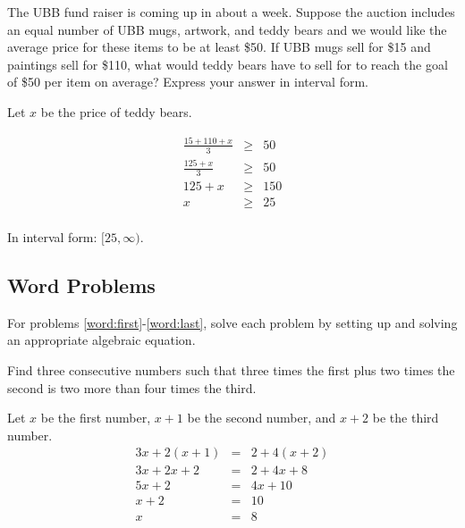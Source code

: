 \documentclass[fleqn,addpoints]{exam}
\begin{document}
\begin{questions}
\begin{solution}[4 cm]
\end{solution}

\question[5] 
\label{inequality:last}

The UBB fund raiser is coming up in about a week.  Suppose the auction includes an equal number of UBB
mugs, artwork, and teddy bears and we would like the average price for these items to be at least \$50.  If UBB mugs
sell for \$15 and paintings sell for \$110, what would teddy bears have to sell for to reach the goal of \$50 per item
on average?  Express your answer in interval form.

\begin{solution}[4 cm]
Let $x$ be the price of teddy bears.

\begin{eqnarray*}
  \frac{15 + 110 + x}{3} &\geq& 50 \\
  \frac{125 + x}{3} &\geq& 50 \\
  125 + x &\geq& 150 \\
  x &\geq& 25 \\
\end{eqnarray*}

In interval form: \( [25, \infty) \).
\end{solution}

\pagebreak

\subsection{Word Problems}

For problems \ref{word:first}-\ref{word:last}, solve each problem by setting up and solving an appropriate algebraic equation.

\question[5]
\label{word:first}

Find three consecutive numbers such that three times the first plus two times the second is two more than four times
the third.

\begin{solution}[4 cm]
Let $x$ be the first number, $x + 1$ be the second number, and $x + 2$ be the third number.
\begin{eqnarray*}
  3x + 2(x + 1) &=& 2 + 4(x + 2) \\
  3x + 2x + 2 &=& 2 + 4x + 8 \\
  5x + 2 &=& 4x + 10 \\
  x + 2 &=& 10 \\
  x  &=& 8 \\
\end{eqnarray*}


\end{solution}
\end{questions}
\end{document}
